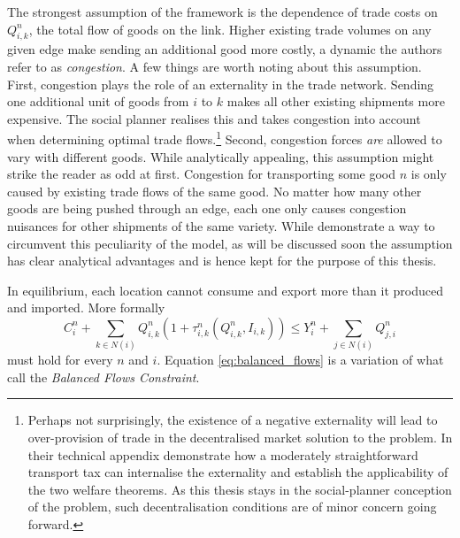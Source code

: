 \documentclass[11pt, oneside]{article}   	%
\begin{document}
The strongest assumption of the \citeauthor{fajgelbaum_optimal_2017} framework is the dependence of trade costs on $Q_{i,k}^{n}$, the total flow of goods on the link. Higher existing trade volumes on any given edge make sending an additional good more costly, a dynamic the authors refer to as \emph{congestion}. A few things are worth noting about this assumption. First, congestion plays the role of an externality in the trade network. Sending one additional unit of goods from $i$ to $k$ makes all other existing shipments more expensive. The social planner realises this and takes congestion into account when determining optimal trade flows.\footnote{Perhaps not surprisingly, the existence of a negative externality will lead to over-provision of trade in the decentralised market solution to the problem. In their technical appendix \citeauthor{fajgelbaum_optimal_2017} demonstrate how a moderately straightforward transport tax can internalise the externality and establish the applicability of the two welfare theorems. As this thesis stays in the social-planner conception of the problem, such decentralisation conditions are of minor concern going forward.} Second, congestion forces \emph{are} allowed to vary with different goods. While analytically appealing, this assumption might strike the reader as odd at first. Congestion for transporting some good $n$ is only caused by existing trade flows of the same good. No matter how many other goods are being pushed through an edge, each one only causes congestion nuisances for other shipments of the same variety. While \citeauthor{fajgelbaum_optimal_2017} demonstrate a way to circumvent this peculiarity of the model, as will be discussed soon the assumption has clear analytical advantages and is hence kept for the purpose of this thesis.

In equilibrium, each location cannot consume and export more than it produced and imported. More formally
\begin{equation}
  C_{i}^{n} + \sum_{k\in N(i)}^{}Q_{i,k}^{n}(1+\tau_{i,k}^{n}(Q_{i,k}^{n}, I_{i,k})) \leq Y_{i}^{n} + \sum_{j\in N(i)}^{}Q_{j,i}^{n}
  \label{eq:balanced_flows}
\end{equation}
must hold for every $n$ and $i$. Equation \eqref{eq:balanced_flows} is a variation of what \citeauthor{fajgelbaum_optimal_2017} call the \emph{Balanced Flows Constraint}.
\end{document}
